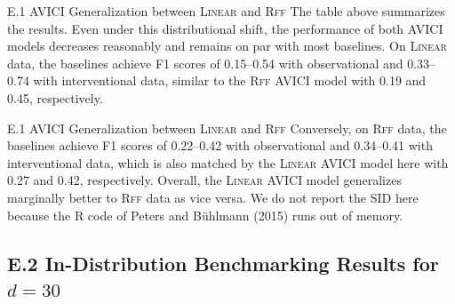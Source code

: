 \documentclass[aspectratio=169,10pt]{beamer}
\newcommand{\domain}[1]{\textsc{#1}}
\newcommand{\lineardomain}{\domain{Linear}\xspace}
\newcommand{\rffdomain}{\domain{Rff}\xspace}
\newcommand{\ours}{AVICI\xspace}
\begin{document}
\begin{frame}{E.1 \ours Generalization between \lineardomain and \rffdomain}
\small
The table above summarizes the results. Even under this distributional shift, the performance of both \ours models decreases reasonably and remains on par with most baselines. On \lineardomain data, the baselines achieve F1 scores of \num{0.15}--\num{0.54} with observational and \num{0.33}--\num{0.74} with interventional data, similar to the \rffdomain \ours model with \num{0.19} and \num{0.45}, respectively.
\end{frame}

\begin{frame}{E.1 \ours Generalization between \lineardomain and \rffdomain}
\small
Conversely, on \rffdomain data, the baselines achieve F1 scores of \num{0.22}--\num{0.42} with observational and \num{0.34}--\num{0.41} with interventional data, which is also matched by the \lineardomain \ours model here with \num{0.27} and \num{0.42}, respectively. Overall, the \lineardomain \ours model generalizes marginally better to \rffdomain data as vice versa. We do not report the SID here because the R code of Peters and B\"uhlmann (2015) runs out of memory.
\end{frame}

\subsection{E.2 In-Distribution Benchmarking Results for $d=30$}
\end{document}
